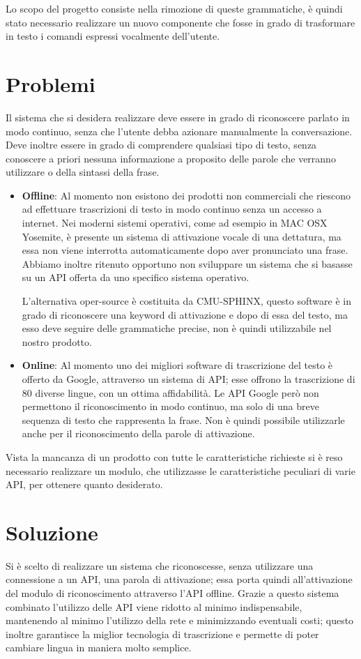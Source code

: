 \documentclass[twoside]{supsistudent}
\begin{document}
Lo scopo del progetto consiste nella rimozione di queste grammatiche, è quindi stato necessario realizzare un nuovo componente che fosse in grado di trasformare in testo i comandi espressi vocalmente dell'utente.
\section{Problemi}
Il sistema che si desidera realizzare deve essere in grado di riconoscere parlato in modo continuo, senza che l'utente debba azionare manualmente la conversazione. 
Deve inoltre essere in grado di comprendere qualsiasi tipo di testo, senza conoscere a priori nessuna informazione a proposito delle parole che verranno utilizzare o della sintassi della frase. 


\begin{itemize}
	\item \textbf{Offline}: Al momento non esistono dei prodotti non commerciali che riescono ad effettuare trascrizioni di testo in modo continuo senza un accesso a internet. Nei moderni sistemi operativi, come ad esempio in MAC OSX Yosemite, è presente un sistema di 		attivazione vocale di una dettatura, ma essa non viene interrotta automaticamente dopo aver pronunciato una frase. Abbiamo inoltre ritenuto opportuno non sviluppare un sistema che si basasse su un API offerta da uno specifico sistema operativo. 
	
	L'alternativa oper-source è costituita da CMU-SPHINX, questo software è in grado di riconoscere una keyword di attivazione e dopo di essa del testo, ma esso deve seguire delle grammatiche precise, non è quindi utilizzabile nel nostro prodotto.
	\item \textbf{Online}: Al momento uno dei migliori software di trascrizione del testo è offerto da Google, attraverso un sistema di API; esse offrono la trascrizione di 80 diverse lingue, con un ottima affidabilità.
		Le API Google però non permettono il riconoscimento in modo continuo, ma solo di una breve sequenza di testo che rappresenta la frase.
		Non è quindi possibile utilizzarle anche per il riconoscimento della parole di attivazione.
\end{itemize}

Vista la mancanza di un prodotto con tutte le caratteristiche richieste si è reso necessario realizzare un modulo, che utilizzasse le caratteristiche peculiari di varie API, per ottenere quanto desiderato.


\section{Soluzione}
Si è scelto di realizzare un sistema che riconoscesse, senza utilizzare una connessione a un API, una parola di attivazione; essa porta quindi all'attivazione del modulo di riconoscimento attraverso l'API offline.
Grazie a questo sistema combinato l'utilizzo delle API viene ridotto al minimo indispensabile, mantenendo al minimo l'utilizzo della rete e minimizzando eventuali costi; questo inoltre garantisce la miglior tecnologia di trascrizione e permette di poter cambiare lingua in maniera molto semplice.
\end{document}
